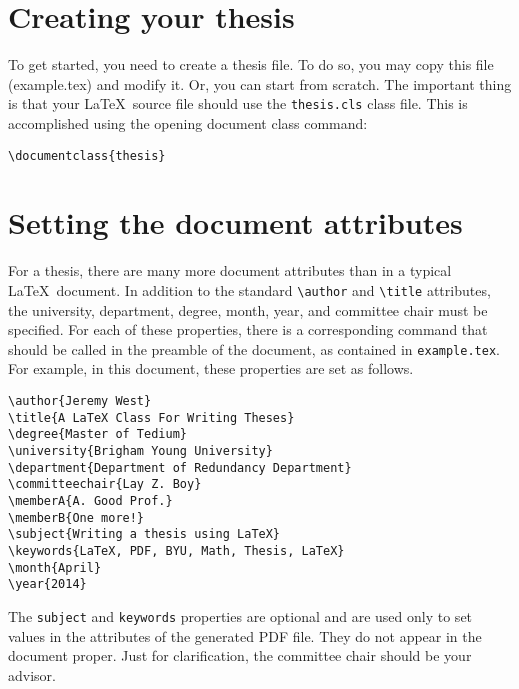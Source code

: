 \documentclass[12pt]{thesis}
\begin{document}
\section{Creating your thesis}\label{test}
To get started, you need to create a thesis file. To do so, you may copy this file (example.tex) and modify it. Or, you can start from scratch. The important thing is that your \LaTeX\ source file should use the \texttt{thesis.cls} class file. This is accomplished using the opening document class command:
\begin{verbatim}
\documentclass{thesis}
\end{verbatim}

\section{Setting the document attributes}\label{sec:document-attributes}
For a thesis, there are many more document attributes than in a typical \LaTeX\ document. In addition to the standard \verb=\author= and \verb=\title= attributes, the university, department, degree, month, year, and committee chair must be specified. For each of these properties, there is a corresponding command that should be called in the preamble of the document, as contained in \texttt{example.tex}. For example, in this document, these properties are set as follows.
\begin{verbatim}
\author{Jeremy West}
\title{A LaTeX Class For Writing Theses}
\degree{Master of Tedium}
\university{Brigham Young University}
\department{Department of Redundancy Department}
\committeechair{Lay Z. Boy}
\memberA{A. Good Prof.}
\memberB{One more!}
\subject{Writing a thesis using LaTeX}
\keywords{LaTeX, PDF, BYU, Math, Thesis, LaTeX}
\month{April}
\year{2014}
\end{verbatim}
The \texttt{subject} and \texttt{keywords} properties are optional and are used only to set values in the attributes of the generated PDF file. They do not appear in the document proper. Just for clarification, the committee chair should be your advisor.
\end{document}
